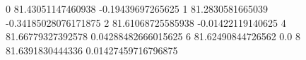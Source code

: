 0 81.43051147460938 -0.19439697265625
1 81.2830581665039 -0.34185028076171875
2 81.61068725585938 -0.01422119140625
4 81.66779327392578 0.04288482666015625
6 81.62490844726562 0.0
8 81.6391830444336 0.01427459716796875
